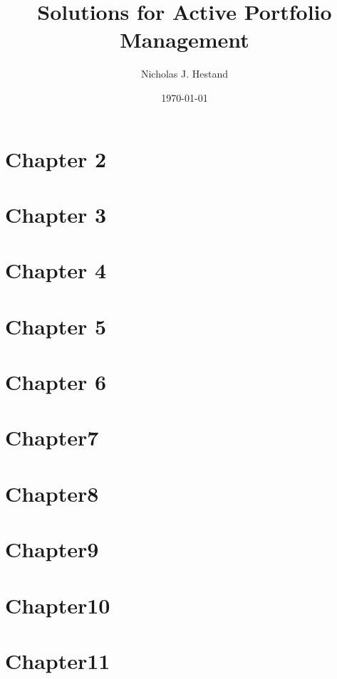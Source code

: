 \documentclass[10pt]{article}
\begin{document}
  \title{Solutions for Active Portfolio Management}
  \author{Nicholas J. Hestand}
  \date{\today}
  
  \maketitle
  
  \section*{Chapter 2}
  
  
  \newpage
  \section*{Chapter 3}
  
  
  \newpage
  \section*{Chapter 4}
  
  
  \newpage
  \section*{Chapter 5}
  
  
  \newpage
  \section*{Chapter 6}
  
  
  \newpage
  \section*{Chapter7}
  
  
  \newpage
  \section*{Chapter8}
  
  
  \newpage
  \section*{Chapter9}
  
  
  \newpage
  \section*{Chapter10}
  
  
  \newpage
  \section*{Chapter11}
  
\end{document}
